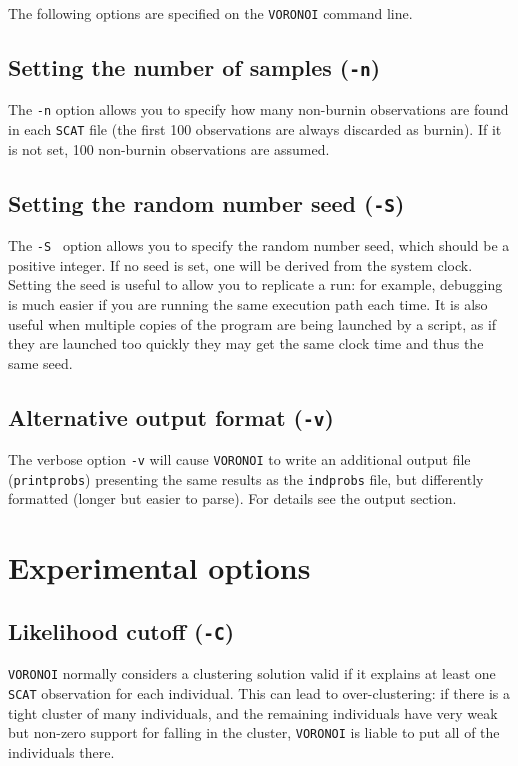 \documentclass[10pt,titlepage,times,letterpaper]{article}
\def\SCAT{{\tt SCAT} }
\def\VORONOI{{\tt VORONOI} }
\begin{document}
The following options are specified on the \VORONOI command line.

\subsection{Setting the number of samples ({\tt -n})}

The {\tt -n} option allows you to specify how many non-burnin observations are found in each
\SCAT file (the first 100 observations are always discarded as burnin).  If it is not set,
100 non-burnin observations are assumed.

\subsection{Setting the random number seed  ({\tt -S})}

The {\tt -S } option allows you to specify the random number seed, which should be a
positive integer.  If no seed is set, one will be derived from the system clock.
Setting the seed is useful to allow you to replicate a run:  for example, debugging is
much easier if you are running the same execution path each time.
It is also useful when multiple copies of the program are being launched by a script,
as if they are launched too quickly they may get the same clock time and thus the same seed.

\subsection{Alternative output format  ({\tt -v})}

The verbose option {\tt -v} will cause \VORONOI to write an additional output
file ({\tt printprobs}) presenting the same results as the {\tt indprobs} file, but differently formatted (longer
but easier to parse).  For details see the output section.

\section{Experimental options}

\subsection{Likelihood cutoff ({\tt -C})}

\VORONOI normally considers a clustering solution valid if it explains at least
one \SCAT observation for each individual.  This can lead to over-clustering:  if there
is a tight cluster of many individuals, and the remaining individuals have very weak but
non-zero support for falling in the cluster, \VORONOI is liable to put all of the individuals
there.
\end{document}
